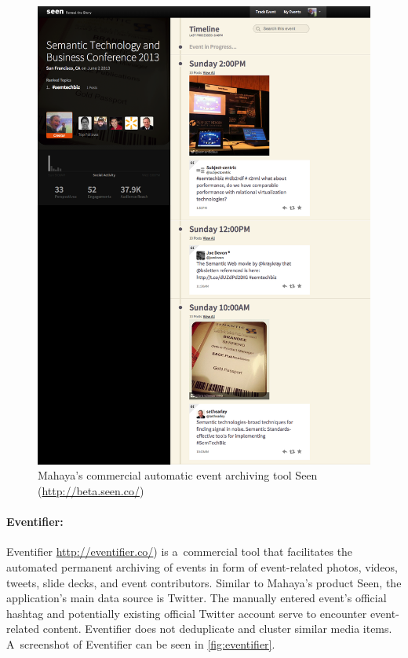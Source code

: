 \begin{figure}
  \centering
  \includegraphics[width=\linewidth]{seen.png}
  \caption[Mahaya's commercial automatic event archiving tool Seen]{Mahaya's commercial automatic event archiving tool Seen
    (\url{http://beta.seen.co/})}
  \label{fig:seen}
\end{figure}

\paragraph{Eventifier:}

Eventifier \url{http://eventifier.co/}) is a~commercial tool
that facilitates the automated permanent archiving of events
in form of event-related photos, videos, tweets, slide decks, 
and event contributors.
Similar to Mahaya's product Seen,
the application's main data source is Twitter.
The manually entered event's official hashtag and potentially existing
official Twitter account serve to encounter event-related content.
Eventifier does not deduplicate and cluster
similar media items.
A~screenshot of Eventifier can be seen in \autoref{fig:eventifier}.

